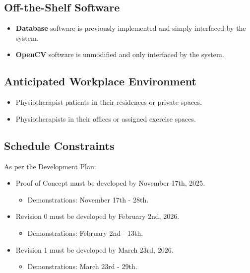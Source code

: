 \documentclass[12pt]{article}
\begin{document}
\subsection{Off-the-Shelf Software}
\begin{itemize}
  \item \textbf{Database} software is previously implemented and simply interfaced by the system.
  \item \textbf{OpenCV} software is unmodified and only interfaced by the system.
\end{itemize}

\subsection{Anticipated Workplace Environment}
\begin{itemize}
  \item Physiotherapist patients in their residences or private spaces.
  \item Physiotherapists in their offices or assigned exercise spaces.
\end{itemize}

\subsection{Schedule Constraints}
As per the \href{https://github.com/M9Huynh/technically-functional/blob/7ff500c1d16686d4d7926d96109d83b87b307b87/docs/DevelopmentPlan/DevelopmentPlan.pdf}{Development Plan}:
\begin{itemize}
  \item Proof of Concept must be developed by November 17th, 2025.
  \begin{itemize}
    \item Demonstrations: November 17th - 28th.
  \end{itemize}
  \item Revision 0 must be developed by February 2nd, 2026.
  \begin{itemize}
    \item Demonstrations: February 2nd - 13th.
  \end{itemize}
  \item Revision 1 must be developed by March 23rd, 2026.
  \begin{itemize}
    \item Demonstrations: March 23rd - 29th.
  \end{itemize}
\end{itemize}
\end{document}
